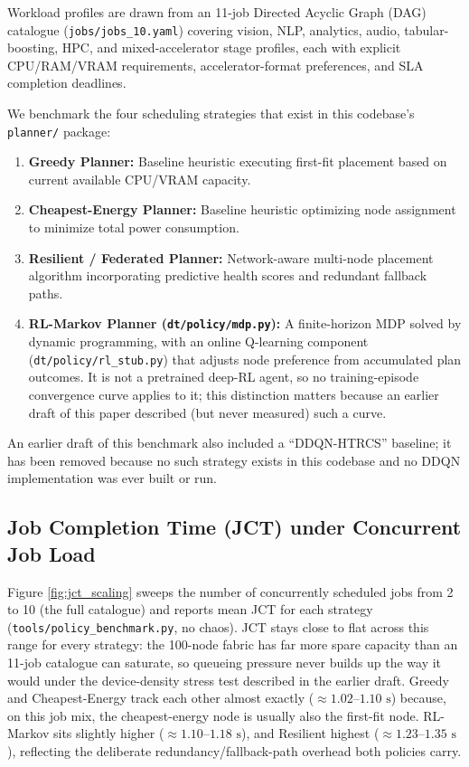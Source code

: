 \documentclass[twoside,twocolumn,10pt]{article}
\begin{document}
Workload profiles are drawn from an 11-job Directed Acyclic Graph (DAG) catalogue (\texttt{jobs/jobs\_10.yaml}) covering vision, NLP, analytics, audio, tabular-boosting, HPC, and mixed-accelerator stage profiles, each with explicit CPU/RAM/VRAM requirements, accelerator-format preferences, and SLA completion deadlines.

We benchmark the four scheduling strategies that exist in this codebase's \texttt{planner/} package:
\begin{enumerate}
    \item \textbf{Greedy Planner:} Baseline heuristic executing first-fit placement based on current available CPU/VRAM capacity.
    \item \textbf{Cheapest-Energy Planner:} Baseline heuristic optimizing node assignment to minimize total power consumption.
    \item \textbf{Resilient / Federated Planner:} Network-aware multi-node placement algorithm incorporating predictive health scores and redundant fallback paths.
    \item \textbf{RL-Markov Planner (\texttt{dt/policy/mdp.py}):} A finite-horizon MDP solved by dynamic programming, with an online Q-learning component (\texttt{dt/policy/rl\_stub.py}) that adjusts node preference from accumulated plan outcomes. It is not a pretrained deep-RL agent, so no training-episode convergence curve applies to it; this distinction matters because an earlier draft of this paper described (but never measured) such a curve.
\end{enumerate}
An earlier draft of this benchmark also included a ``DDQN-HTRCS'' baseline; it has been removed because no such strategy exists in this codebase and no DDQN implementation was ever built or run.

\subsection{Job Completion Time (JCT) under Concurrent Job Load}
Figure \ref{fig:jct_scaling} sweeps the number of concurrently scheduled jobs from 2 to 10 (the full catalogue) and reports mean JCT for each strategy (\texttt{tools/policy\_benchmark.py}, no chaos). JCT stays close to flat across this range for every strategy: the 100-node fabric has far more spare capacity than an 11-job catalogue can saturate, so queueing pressure never builds up the way it would under the device-density stress test described in the earlier draft. Greedy and Cheapest-Energy track each other almost exactly ($\approx 1.02$--$1.10\text{ s}$) because, on this job mix, the cheapest-energy node is usually also the first-fit node. RL-Markov sits slightly higher ($\approx 1.10$--$1.18\text{ s}$), and Resilient highest ($\approx 1.23$--$1.35\text{ s}$), reflecting the deliberate redundancy/fallback-path overhead both policies carry.
\end{document}
